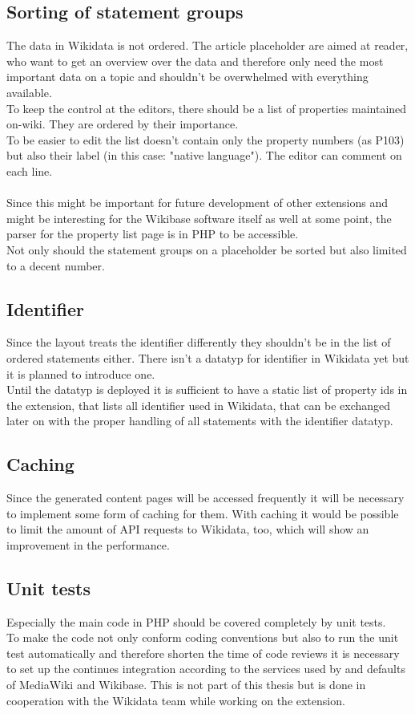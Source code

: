\subsection{Sorting of statement groups }
The data in Wikidata is not ordered. The article placeholder are aimed at reader, who want to get an overview over the data and therefore only need the most important data on a topic and shouldn't be overwhelmed with everything available. 
\\
To keep the control at the editors, there should be a list of properties maintained on-wiki. They are ordered by their importance. \\
To be easier to edit the list doesn't contain only the property numbers (as P103) but also their label (in this case: "native language"). The editor can comment on each line. \\
\\
Since this might be important for future development of other extensions and might be interesting for the Wikibase software itself as well at some point, the parser for the property list page is in PHP to be accessible. \\
Not only should the statement groups on a placeholder be sorted but also limited to a decent number. 

\subsection {Identifier}
Since the layout treats the identifier differently they shouldn't be in the list of ordered statements either. There isn't a datatyp for identifier in Wikidata yet but it is planned to introduce one. \\
Until the datatyp is deployed it is sufficient to have a static list of property ids in the extension, that lists all identifier used in Wikidata, that can be exchanged later on with the proper handling of all statements with the identifier datatyp. 

\subsection{Caching}
Since the generated content pages will be accessed frequently  it will be necessary to implement some form of caching for them. With caching it would be possible to limit the amount of API requests to Wikidata, too, which will show an improvement in the performance. 

\subsection {Unit tests}
Especially the main code in PHP should be covered completely by unit tests.\\
To make the code not only conform coding conventions but also to run the unit test automatically and therefore shorten the time of code reviews it is necessary to set up the continues integration according to the services used by and defaults of MediaWiki and Wikibase.  This is not part of this thesis but is done in cooperation with the Wikidata team while working on the extension.